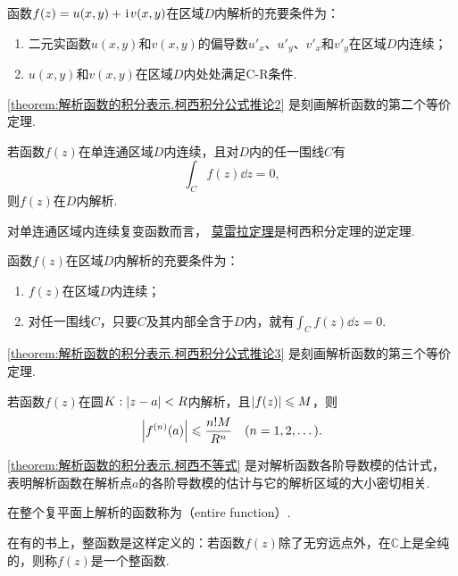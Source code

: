 \begin{corollary}\label{theorem:解析函数的积分表示.柯西积分公式推论2}
函数\(f(z)=u(x,y)+\kern1pt\mathrm{i}\kern1pt v(x,y)\)在区域\(D\)内解析的充要条件为：
\begin{enumerate}
\item 二元实函数\(u(x,y)\)和\(v(x,y)\)的偏导数\(u'_x\)、\(u'_y\)、\(v'_x\)和\(v'_y\)在区域\(D\)内连续；
\item \(u(x,y)\)和\(v(x,y)\)在区域\(D\)内处处满足C-R条件.
\end{enumerate}
\end{corollary}
\cref{theorem:解析函数的积分表示.柯西积分公式推论2} 是刻画解析函数的第二个等价定理.

\begin{theorem}[莫雷拉定理]\label{theorem:解析函数的积分表示.莫雷拉定理}
若函数\(f(z)\)在单连通区域\(D\)内连续，且对\(D\)内的任一围线\(C\)有\[
\int_C f(z) \dd{z} = 0,
\]则\(f(z)\)在\(D\)内解析.
\end{theorem}
对单连通区域内连续复变函数而言，%
\hyperref[theorem:解析函数的积分表示.莫雷拉定理]{莫雷拉定理}是柯西积分定理的逆定理.

\begin{theorem}\label{theorem:解析函数的积分表示.柯西积分公式推论3}
函数\(f(z)\)在区域\(D\)内解析的充要条件为：
\begin{enumerate}
\item \(f(z)\)在区域\(D\)内连续；
\item 对任一围线\(C\)，只要\(C\)及其内部全含于\(D\)内，就有\(\int_C f(z) \dd{z} = 0\).
\end{enumerate}
\end{theorem}
\cref{theorem:解析函数的积分表示.柯西积分公式推论3} 是刻画解析函数的第三个等价定理.

\begin{theorem}[柯西不等式]
若函数\(f(z)\)在圆\(K: \abs{z-a}<R\)内解析，且\(\abs{f(z)} \leqslant M\)，则\begin{equation}\label{theorem:解析函数的积分表示.柯西不等式}
\abs{f^{(n)}(a)} \leqslant \frac{n! M}{R^n}
\quad(n=1,2,\dots).
\end{equation}
\end{theorem}
\cref{theorem:解析函数的积分表示.柯西不等式} 是对解析函数各阶导数模的估计式，表明解析函数在解析点\(a\)的各阶导数模的估计与它的解析区域的大小密切相关.

\begin{definition}
在整个复平面上解析的函数称为（entire function）.
\end{definition}
在有的书上，整函数是这样定义的：若函数\(f(z)\)除了无穷远点外，在\(\mathbb{C}\)上是全纯的，则称\(f(z)\)是一个整函数.

